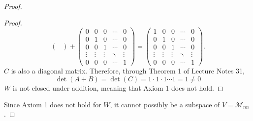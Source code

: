 \documentclass{article}
\begin{document}
\begin{proof}
\begin{proof}
\[\begin{pmatrix}
      \end{pmatrix} + \begin{pmatrix}
        0      & 0      & 0      & \cdots & 0      \\
        0      & 1      & 0      & \cdots & 0      \\
        0      & 0      & 1      & \cdots & 0      \\
        \vdots & \vdots & \vdots & \ddots & \vdots \\
        0      & 0      & 0      & \cdots & 1
      \end{pmatrix} = \begin{pmatrix}
        1      & 0      & 0      & \cdots & 0      \\
        0      & 1      & 0      & \cdots & 0      \\
        0      & 0      & 1      & \cdots & 0      \\
        \vdots & \vdots & \vdots & \ddots & \vdots \\
        0      & 0      & 0      & \cdots & 1
      \end{pmatrix}.
    \]
    $C$ is also a diagonal matrix. Therefore, through Theorem 1 of Lecture Notes 31,
    \[
      \det(A + B) = \det(C) = 1 \cdot 1 \cdot 1 \cdots 1 = 1 \neq 0
    \]
    $W$ is not closed under addition, meaning that Axiom 1 does not hold.
  \end{proof}
  Since Axiom 1 does not hold for $W$, it cannot possibly be a subspace of $V = \mathcal{M}_{nn}$.
\end{proof}
\qdash
\end{document}
